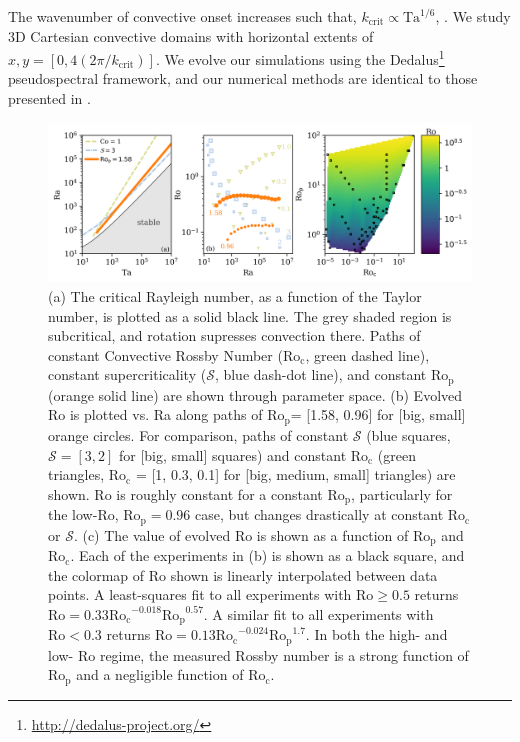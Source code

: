 \documentclass[twocolumn, amsmath, amsfonts, amssymb]{aastex62}
\newcommand{\pro}{\ensuremath{\text{Ro}_{\text{p}}}}
\newcommand{\con}{\ensuremath{\text{Ro}_{\text{c}}}}
\begin{document}
The wavenumber of convective onset increases such that, $k_{\text{crit}} \propto \text{Ta}^{1/6}$, 
\citep{Chandrasekhar,calkins&all2015a}.
We study 3D Cartesian convective domains with horizontal extents of
$x, y = [0, 4(2\pi/k_{\text{crit}})]$. 
We evolve our simulations using the Dedalus\footnote{\url{http://dedalus-project.org/}} 
pseudospectral framework, and our numerical methods are identical to those presented
in \AB.

\begin{figure}[t!]
    \includegraphics[width=\textwidth]{parameter_space.png}
    \caption{(a) The critical Rayleigh number, as a function of the Taylor number, 
    is plotted as a solid black line. The grey shaded region is subcritical, and rotation
    supresses convection there. Paths of constant Convective Rossby Number
    ($\con$, green dashed line), constant supercriticality ($\mathcal{S}$, blue dash-dot line), and 
    constant \pro (orange solid line) are shown through parameter space. 
    (b) Evolved Ro is plotted vs. Ra along paths of \pro = [1.58, 0.96] for [big, small] orange circles.
    For comparison, paths of constant $\mathcal{S}$ (blue squares, $\mathcal{S} = [3,2]$ 
    for [big, small] squares)
    and constant $\con$ (green triangles, $\con$ = [1, 0.3, 0.1] for [big, medium, small] triangles) are shown.
    Ro is roughly constant for a constant \pro, particularly for the low-Ro, $\pro=0.96$ case, 
    but changes drastically at constant $\con$ or $\mathcal{S}$.
    (c) The value of evolved Ro is shown as a function of $\pro$ and $\con$. Each of the experiments in (b) is shown as a black square,
	and the colormap of Ro shown is linearly interpolated between data points. A least-squares fit to all experiments with
	$\text{Ro} \geq 0.5$ returns $\text{Ro} = 0.33 \con^{-0.018}\pro^{0.57}$. A similar fit to all experiments with
	$\text{Ro} < 0.3$ returns $\text{Ro} = 0.13 \con^{-0.024}\pro^{1.7}$. In both the high- and low- Ro regime, the measured
	Rossby number is a strong function of $\pro$ and a negligible function of $\con$.
    \label{fig:parameter_space} }
\end{figure}
\end{document}
